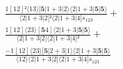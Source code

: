 \documentclass[varwidth, border=5pt]{standalone}
\begin{document}
\begin{my}
$\begin{gathered}
\scriptscriptstyle\frac{1[12]²⟨13⟩[𝟓|1+3|2⟩⟨2|1+3|𝟓|𝟓⟩}{⟨2|1+3|2]²⟨2|1+3|4]s_{123}} +\\
\scriptscriptstyle\frac{1[12]⟨23⟩[𝟓4]⟨2|1+3|𝟓|𝟓⟩}{⟨2|1+3|2]⟨2|1+3|4]²} +\\
\scriptscriptstyle\frac{-1[12]⟨23⟩[𝟓|2+3|1⟩⟨2|1+3|𝟓|𝟓⟩}{⟨12⟩⟨2|1+3|2]⟨2|1+3|4]s_{123}} \phantom{+}
\end{gathered}$
\end{my}
\end{document}
